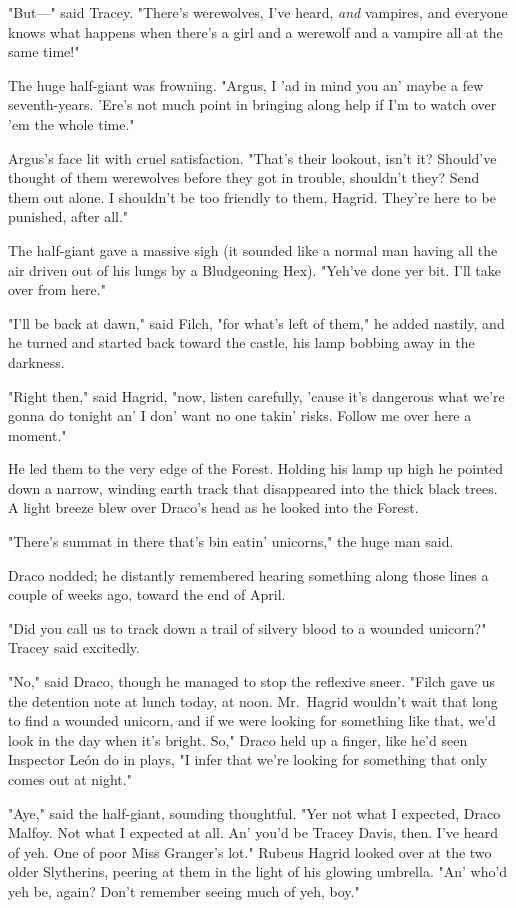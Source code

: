 "But---" said Tracey. "There's werewolves, I've heard, \emph{and} vampires, and
everyone knows what happens when there's a girl and a werewolf and a vampire
all at the same time!"

The huge half-giant was frowning. "Argus, I 'ad in mind you an' maybe a few
seventh-years. 'Ere's not much point in bringing along help if I'm to watch
over 'em the whole time."

Argus's face lit with cruel satisfaction. "That's their lookout, isn't it?
Should've thought of them werewolves before they got in trouble, shouldn't
they? Send them out alone. I shouldn't be too friendly to them, Hagrid. They're
here to be punished, after all."

The half-giant gave a massive sigh (it sounded like a normal man having all the
air driven out of his lungs by a Bludgeoning Hex). "Yeh've done yer bit. I'll
take over from here."

"I'll be back at dawn," said Filch, "for what's left of them," he added
nastily, and he turned and started back toward the castle, his lamp bobbing
away in the darkness.

"Right then," said Hagrid, "now, listen carefully, 'cause it's dangerous what
we're gonna do tonight an' I don' want no one takin' risks. Follow me over here
a moment."

He led them to the very edge of the Forest. Holding his lamp up high he pointed
down a narrow, winding earth track that disappeared into the thick black trees.
A light breeze blew over Draco's head as he looked into the Forest.

"There's summat in there that's bin eatin' unicorns," the huge man said.

Draco nodded; he distantly remembered hearing something along those lines a
couple of weeks ago, toward the end of April.

"Did you call us to track down a trail of silvery blood to a wounded unicorn?"
Tracey said excitedly.

"No," said Draco, though he managed to stop the reflexive sneer. "Filch gave us
the detention note at lunch today, at noon. Mr.~Hagrid wouldn't wait that long
to find a wounded unicorn, and if we were looking for something like that, we'd
look in the day when it's bright. So," Draco held up a finger, like he'd seen
Inspector León do in plays, "I infer that we're looking for something that only
comes out at night."

"Aye," said the half-giant, sounding thoughtful. "Yer not what I expected,
Draco Malfoy. Not what I expected at all. An' you'd be Tracey Davis, then. I've
heard of yeh. One of poor Miss Granger's lot." Rubeus Hagrid looked over at the
two older Slytherins, peering at them in the light of his glowing umbrella.
"An' who'd yeh be, again? Don't remember seeing much of yeh, boy."

